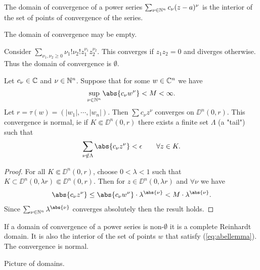 \begin{definition}
    The domain of convergence of a power series $\sum_{\nu \in \mathbb{N}^n} c_\nu (z-a)^\nu$ is the interior of the set of points of convergence of the series.
\end{definition}

\begin{note}
    The domain of convergence may be empty.
\end{note}

\begin{example}
    Consider $\sum_{\nu_1, \nu_2 \geq 0} \nu_1! \nu_2! z_1^{\nu_1} z_2^{\nu_2}$. This converges if $z_1 z_2 = 0$ and diverges otherwise. Thus the domain of convergence is $\emptyset$.
\end{example}

\begin{lemma}\label{lemma:Abels lemma}
    Let $c_\nu \in \mathbb{C}$ and $\nu \in \mathbb{N}^n$. Suppose that for some $w \in \mathbb{C}^n$ we have
    \begin{align}\label{eq:abellemma}
        \sup_{\nu \in \N^n} \abs{c_\nu w^\nu} < M < \infty.
    \end{align}
    Let $r = \tau(w) = (|w_1| , \cdots, |w_n|)$. Then $\sum c_\nu z^\nu$ converges on $\DD^n(0,r)$. This convergence is normal, ie if $K \Subset \DD^n(0,r)$ there exists a finite set $\Lambda$ (a "tail") such that
    \begin{align*}
        \sum_{\nu \not\in \Lambda } \abs{c_\nu z^\nu} < \epsilon \quad \quad \forall z \in K.
    \end{align*}
\end{lemma}

\begin{proof}
    For all $K \Subset \DD^n(0,r)$, choose $0 < \lambda <1$ such that $K \subset \DD^n(0,\lambda r ) \Subset \DD^n(0,r)$. Then for $z \in \DD^n(0 , \lambda r)$ and $\forall \nu$ we have 
    \begin{align*}
        \abs{c_\nu z^\nu } \leq \abs{c_\nu w^\nu} \cdot \lambda^{\abs{\nu}} < M \cdot \lambda^{\abs{\nu}}.
    \end{align*}
    Since $\sum_{\nu \in \N^n} \lambda^{\abs{\nu}}$ converges absolutely then the result holds.
\end{proof}

\begin{corollary}
    If a domain of convergence of a power series is non-$\emptyset$ it is a complete Reinhardt domain. It is also the interior of the set of points $w$ that satisfy (\ref{eq:abellemma}). The convergence is normal.

    Picture of domains.
\end{corollary}


